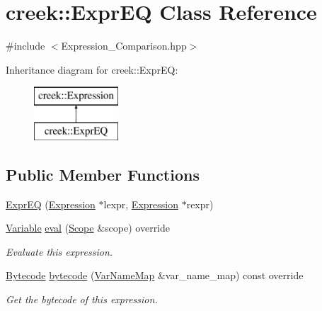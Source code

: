 \hypertarget{classcreek_1_1_expr_e_q}{}\section{creek\+:\+:Expr\+EQ Class Reference}
\label{classcreek_1_1_expr_e_q}


{\ttfamily \#include $<$Expression\+\_\+\+Comparison.\+hpp$>$}

Inheritance diagram for creek\+:\+:Expr\+EQ\+:\begin{figure}[H]
\begin{center}
\leavevmode
\includegraphics[height=2.000000cm]{classcreek_1_1_expr_e_q}
\end{center}
\end{figure}
\subsection*{Public Member Functions}
\begin{DoxyCompactItemize}
\item 
\hyperlink{classcreek_1_1_expr_e_q_a7d7beed096b6997fcbcb22e3f2e09bc5}{Expr\+EQ} (\hyperlink{classcreek_1_1_expression}{Expression} $\ast$lexpr, \hyperlink{classcreek_1_1_expression}{Expression} $\ast$rexpr)
\item 
\hyperlink{classcreek_1_1_variable}{Variable} \hyperlink{classcreek_1_1_expr_e_q_a15063eb60b1cdd652f08ec7b6abf497d}{eval} (\hyperlink{classcreek_1_1_scope}{Scope} \&scope) override
\begin{DoxyCompactList}\small\item\em Evaluate this expression. \end{DoxyCompactList}\item 
\hyperlink{classcreek_1_1_bytecode}{Bytecode} \hyperlink{classcreek_1_1_expr_e_q_a405208d0b94153c128dbd3174ea7bad7}{bytecode} (\hyperlink{classcreek_1_1_var_name_map}{Var\+Name\+Map} \&var\+\_\+name\+\_\+map) const  override\hypertarget{classcreek_1_1_expr_e_q_a405208d0b94153c128dbd3174ea7bad7}{}\label{classcreek_1_1_expr_e_q_a405208d0b94153c128dbd3174ea7bad7}

\begin{DoxyCompactList}\small\item\em Get the bytecode of this expression. \end{DoxyCompactList}\end{DoxyCompactItemize}


